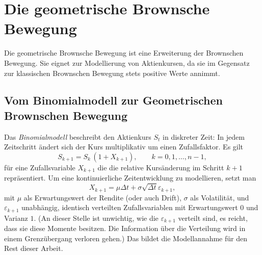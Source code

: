 \section{Die geometrische Brownsche Bewegung}

Die geometrische Brownsche Bewegung ist eine Erweiterung der Brownschen Bewegung. 
Sie eignet zur Modellierung von Aktienkursen, da sie im Gegensatz zur klassischen 
Brownschen Bewegung stets positive Werte annimmt.


\subsection{Vom Binomialmodell zur Geometrischen Brownschen Bewegung}

Das \textit{Binomialmodell} beschreibt den Aktienkurs $S_t$ in diskreter Zeit: In jedem Zeitschritt ändert sich der Kurs multiplikativ um einen Zufallsfaktor. Es gilt
$$
S_{k+1} = S_k \,(1 + X_{k+1}), \qquad k = 0,1,\dots,n-1,
$$
für eine Zufallsvariable $X_{k+1}$ die die relative Kursänderung im Schritt $k+1$ repräsentiert. Um eine kontinuierliche Zeitentwicklung zu modellieren, setzt man
$$
X_{k+1} = \mu  \Delta t + \sigma \sqrt{\Delta t}\varepsilon_{k+1},
$$
mit $\mu$ als Erwartungswert der Rendite (oder auch Drift), $\sigma$ als Volatilität, und $\varepsilon_{k+1}$ unabhängig, identisch verteilten Zufallsvariablen mit Erwartungswert $0$ und Varianz $1$. 
(An dieser Stelle ist unwichtig, wie die $\varepsilon_{k+1}$ verteilt sind, es reicht, dass sie diese Momente besitzen. 
Die Information über die Verteilung wird in einem Grenzübergang verloren gehen.)
Das bildet die Modellannahme für den Rest dieser Arbeit.

